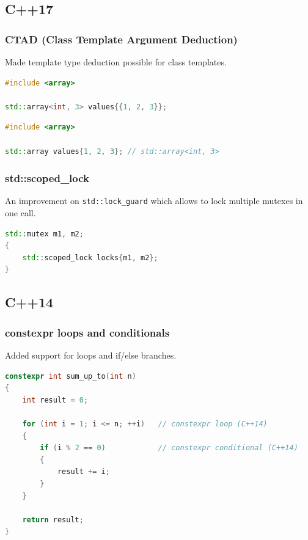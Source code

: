 \documentclass{article}
\begin{document}
\subsection{C++17}
\subsubsection{CTAD (Class Template Argument Deduction)}
Made template type deduction possible for class templates.
\begin{lstlisting}[language=cpp,caption={Pre-C++17: std::array without CTAD}]
#include <array>

std::array<int, 3> values{{1, 2, 3}};
\end{lstlisting}

\begin{lstlisting}[language=cpp,caption={C++17: std::array with CTAD}]
#include <array>

std::array values{1, 2, 3}; // std::array<int, 3>
\end{lstlisting}

\subsubsection{std::scoped\_lock}
An improvement on \texttt{std::lock\_guard} which allows to lock multiple mutexes in one call.

\begin{lstlisting}[language=cpp,caption={std::scoped\_lock}]
std::mutex m1, m2;
{
    std::scoped_lock locks{m1, m2};
}
\end{lstlisting}

\subsection{C++14}
\subsubsection{constexpr loops and conditionals}
Added support for loops and if/else branches.
\begin{lstlisting}[language=cpp,caption={C++14: constexpr with loops and conditionals}]
constexpr int sum_up_to(int n)
{
    int result = 0;

    for (int i = 1; i <= n; ++i)   // constexpr loop (C++14)
    {
        if (i % 2 == 0)            // constexpr conditional (C++14)
        {
            result += i;
        }
    }

    return result;
}
\end{lstlisting}
\end{document}
